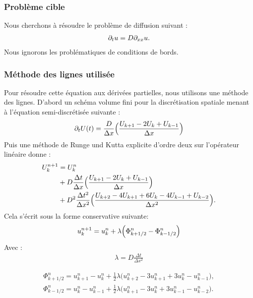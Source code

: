 \subsubsection{Problème cible}
    Nous cherchons à résoudre le problème de diffusion suivant :
    \begin{align}
        \partial_t u = D \partial_{xx} u.
    \end{align}
    Nous ignorons les problématiques de conditions de bords.
        \subsubsection{Méthode des lignes utilisée}
            Pour résoudre cette équation aux dérivées partielles, nous utilisons une méthode des lignes. 
            D'abord un schéma volume fini pour la discrétisation spatiale menant à l'équation semi-discrétisée suivante : 
            \begin{align}
                \partial_t U(t) = \frac{D}{\Delta x} \Bigl(\frac{U_{k+1} - 2 U_{k} + U_{k-1}}{\Delta x}\Bigr)
            \end{align}
            Puis une méthode de Runge und Kutta explicite d'ordre deux sur l’opérateur linéaire donne :
            \begin{align}
                U_k^{n+1} &= U_k^n\\ \notag
                &+ D \frac{\Delta t}{\Delta x} \Bigl(\frac{U_{k+1} - 2 U_{k} + U_{k-1}}{\Delta x}\Bigr)\\ \notag
                &+ D^2 \frac{\Delta t^2}{\Delta x^2} \Bigl(\frac{U_{k+2} -4 U_{k+1}  +6 U_{k} -4 U_{k-1} + U_{k-2}}{\Delta x^2}\Bigr).
            \end{align}
            Cela s'écrit sous la forme conservative suivante:
            \begin{align}
                u^{n+1}_k = u^n_k + \lambda \Bigl( \Phi^n_{k+1/2} - \Phi^n_{k-1/2} \Bigr)
            \end{align}
            Avec : 
            \begin{align}
                \lambda = D \frac{\Delta t}{\Delta x^2}
            \end{align}

            \begin{align}
                \Phi^n_{k+1/2} = u^n_{k+1} - u^n_{k} + \frac{1}{2} \lambda \bigl( u^n_{k+2} - 3  u^n_{k+1} + 3 u^n_{k} - u^n_{k-1} \bigr),\\
                \Phi^n_{k-1/2} = u^n_{k} - u^n_{k-1} + \frac{1}{2} \lambda \bigl( u^n_{k+1} - 3  u^n_{k} + 3 u^n_{k-1} - u^n_{k-2} \bigr).  
            \end{align}

